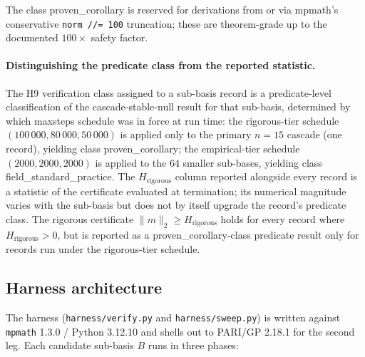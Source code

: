 \documentclass[11pt,a4paper]{article}
\newcommand{\Hrig}{H_{\mathrm{rigorous}}}
\newcommand{\fsp}{\textsf{field\_standard\_practice}}
\newcommand{\pc}{\textsf{proven\_corollary}}
\begin{document}
The class \pc{} is reserved for derivations from \cite[Theorem~1]{fba1999} or
\cite[Corollary~2]{fba1999} via mpmath's conservative
\texttt{norm //= 100}
truncation; these are theorem-grade up to the documented
$100\times$
safety factor.

\paragraph{Distinguishing the predicate class from the reported statistic.}
The H9 verification class assigned to a sub-basis record is a predicate-level
classification of the cascade-stable-null result for that sub-basis,
determined by which maxsteps schedule was in force at run time:
the rigorous-tier schedule
$(100\,000, 80\,000, 50\,000)$
is applied only to the primary $n=15$ cascade (one record), yielding
class \pc{}; the empirical-tier schedule
$(2000, 2000, 2000)$
is applied to the $64$ smaller sub-bases, yielding class \fsp{}.
The
$\Hrig$
column reported alongside every record is a statistic of the
\cite[Theorem~1]{fba1999} certificate evaluated at termination;
its numerical magnitude varies with the sub-basis but does not by itself
upgrade the record's predicate class.
The rigorous certificate
$\|m\|_{2} \ge \Hrig$
holds for every record where
$\Hrig > 0$,
but is reported as a \pc{}-class predicate result only for records run
under the rigorous-tier schedule.

\subsection{Harness architecture}\label{sec:harness}

The harness (\texttt{harness/verify.py} and \texttt{harness/sweep.py}) is
written against
\texttt{mpmath} 1.3.0 / Python 3.12.10
and shells out to PARI/GP 2.18.1 for the second leg.
Each candidate sub-basis $B$ runs in three phases:
\end{document}
